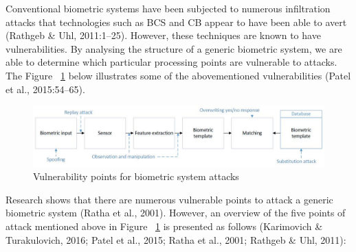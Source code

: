     Conventional biometric systems have been subjected to numerous infiltration attacks that technologies such as BCS and CB appear to have been able to avert (Rathgeb \& Uhl, 2011:1–25). However, these techniques are known to have vulnerabilities. By analysing the structure of a generic biometric system, we are able to determine which particular processing points are vulnerable to attacks. The Figure ~\ref{fig:Vulnerability points for biometric system attacks} below illustrates some of the abovementioned vulnerabilities (Patel et al., 2015:54–65).
    
    
    \begin{figure}[htbp!] 
    \centering    
    \includegraphics[width=1.0\textwidth]{Chapter2/Figs/Vulnerability_points_for_biometric_system_attacks.jpg}
    \caption[Vulnerability points for biometric system attacks]{Vulnerability points for biometric system attacks}
    \label{fig:Vulnerability points for biometric system attacks}
    \end{figure}
    
    Research shows that there are numerous vulnerable points to attack a generic biometric system (Ratha et al., 2001). However, an overview of the five points of attack mentioned above in Figure ~\ref{fig:Vulnerability points for biometric system attacks} is presented as follows (Karimovich \& Turakulovich, 2016; Patel et al., 2015; Ratha et al., 2001; Rathgeb \& Uhl, 2011):
    
